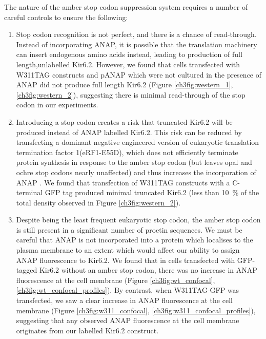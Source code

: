 The nature of the amber stop codon suppression system requires a number of careful controls to ensure the following:

\begin{enumerate}
	\item Stop codon recognition is not perfect, and there is a chance of read-through.
	Instead of incorporating ANAP, it is possible that the translation machinery can insert endogenous amino acids instead, leading to production of full length,unlabelled Kir6.2.
	However, we found that cells transfected with W311TAG constructs and pANAP which were not cultured in the presence of ANAP did not produce full length Kir6.2 (Figure \ref{ch3fig:western_1}, \ref{ch3fig:western_2}), suggesting there is minimal read-through of the stop codon in our experiments.
	\item Introducing a stop codon creates a risk that truncated Kir6.2 will be produced instead of ANAP labelled Kir6.2.
	This risk can be reduced by transfecting a dominant negative engineered version of eukaryotic translation termination factor 1(eRF1-E55D), which does not efficiently terminate protein synthesis in response to the amber stop codon (but leaves opal and ochre stop codons nearly unaffected) and thus increases the incorporation of ANAP \cite{schmied_efficient_2014}.
	We found that transfection of W311TAG constructs with a C-terminal GFP tag produced minimal truncated Kir6.2 (less than \SI{10}{\percent} of the total density observed in Figure \ref{ch3fig:western_2}).
	\item Despite being the least frequent eukaryotic stop codon, the amber stop codon is still present in a significant number of proetin sequences.
	We must be careful that ANAP is not incorporated into a protein which localises to the plasma membrane to an extent which would affect our ability to assign ANAP fluorescence to Kir6.2.
	We found that in cells transfected with GFP-tagged Kir6.2 without an amber stop codon, there was no increase in ANAP fluorescence at the cell membrane (Figure \ref{ch3fig:wt_confocal}, \ref{ch3fig:wt_confocal_profiles}).
	By contrast, when W311TAG-GFP was transfected, we saw a clear increase in ANAP fluorescence at the cell membrane (Figure \ref{ch3fig:w311_confocal}, \ref{ch3fig:w311_confocal_profiles}), suggesting that any observed ANAP fluorescence at the cell membrane originates from our labelled Kir6.2 construct.
\end{enumerate}

